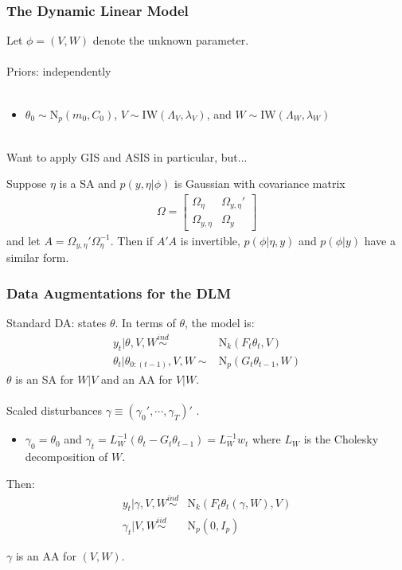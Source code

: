 \documentclass[xcolor=dvipsnames]{beamer}
\newcommand\N{\mathrm{N}}
\begin{document}
\begin{frame}
  \frametitle{The Dynamic Linear Model} 
Let $\phi=(V,W)$ denote the unknown parameter.\\~\\

Priors: independently \\~\\
\begin{itemize}
\item[]$\theta_0\sim \N_p(m_0,C_0)$, $V\sim \mathrm{IW}(\Lambda_V,\lambda_V)$, and $W\sim \mathrm{IW}(\Lambda_W,\lambda_W)$\\~\\
\end{itemize}

\pause Want to apply GIS and ASIS in particular\pause, but...
\begin{theorem}
Suppose $\eta$ is a SA and $p(y,\eta|\phi)$ is Gaussian with covariance matrix
\begin{align*}
\Omega = \begin{bmatrix}   \Omega_\eta & \Omega_{y,\eta}' \\
   \Omega_{y,\eta} & \Omega_y \end{bmatrix}
\end{align*}
and let $A=\Omega_{y,\eta}'\Omega_{\eta}^{-1}$. Then if $A'A$ is invertible, $p(\phi|\eta,y)$ and $p(\phi|y)$ have a similar form.
\end{theorem}

\end{frame}

\begin{frame}
\frametitle{Data Augmentations for the DLM}
Standard DA: states $\theta$. In terms of $\theta$, the model is:
\begin{align*}
y_t|\theta,V,W \stackrel{ind}{\sim} & \N_k(F_t\theta_t,V)\\ 
\theta_t|\theta_{0:(t-1)},V,W \sim & \N_p(G_t\theta_{t-1},W)
\end{align*} 
{\color{blue}$\theta$ is an SA for $W|V$ and an AA for $V|W$.}\\~\\

\pause Scaled disturbances $\gamma\equiv(\gamma_0',\cdots,\gamma_T)'$ \citep{fruhwirth2004efficient}.
\begin{itemize}
\item[]$\gamma_0=\theta_0$ and $\gamma_t=L_W^{-1}(\theta_t - G_t\theta_{t-1})=L_W^{-1}w_t$ where $L_W$ is the Cholesky decomposition of $W$.
\end{itemize}
Then:
\begin{align*}
y_t|\gamma,V,W \stackrel{ind}{\sim} & \N_k(F_t\theta_t(\gamma,W),V) \\
\gamma_t|V,W \stackrel{iid}{\sim} & \N_p(0,I_p)
\end{align*} 

{\color{blue}$\gamma$ is an AA for $(V,W)$.}

\end{frame}
\end{document}
